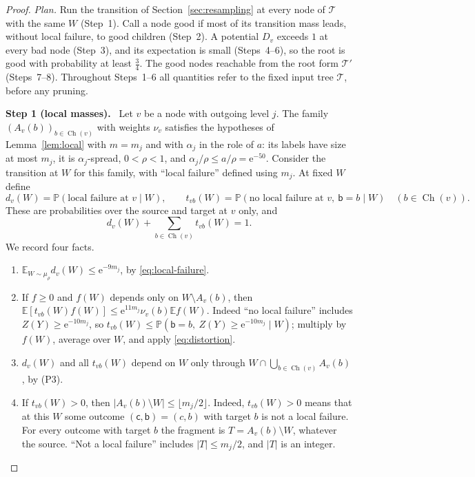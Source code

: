 \documentclass[11pt]{article}
\numberwithin{equation}{section}
\newcommand{\PP}{\mathbb P}
\newcommand{\EE}{\mathbb E}
\newcommand{\TT}{\mathcal T}
\newcommand{\ch}{\operatorname{Ch}}
\newcommand{\ee}{\mathrm e}
\newcommand{\src}{\mathsf c}
\newcommand{\tgt}{\mathsf b}
\newcommand{\step}[2]{\par\medskip\noindent\textbf{Step #1 (#2).}\ }
\begin{document}
\begin{proof}
\emph{Plan.} Run the transition of Section~\ref{sec:resampling} at every
node of $\TT$ with the same $W$ (Step~1). Call a node good if most of
its transition mass leads, without local failure, to good children
(Step~2). A potential $D_v$ exceeds $1$ at every bad node (Step~3), and
its expectation is small (Steps~4--6), so the root is good with
probability at least $\frac34$. The good nodes reachable from the root
form $\TT'$ (Steps~7--8). Throughout Steps~1--6 all quantities refer to
the fixed input tree $\TT$, before any pruning.

\step{1}{local masses}
Let $v$ be a node with outgoing level $j$. The family
$(A_v(b))_{b\in\ch(v)}$ with weights $\nu_v$ satisfies the hypotheses of
Lemma~\ref{lem:local} with $m=m_j$ and with $\alpha_j$ in the role of
$a$: its labels have size at most $m_j$, it is $\alpha_j$-spread,
$0<\rho<1$, and $\alpha_j/\rho\le a/\rho=\ee^{-50}$. Consider the
transition at $W$ for this family, with ``local failure'' defined using
$m_j$. At fixed $W$ define
\[
 d_v(W)=\PP(\text{local failure at }v\mid W),\qquad
 t_{vb}(W)=\PP(\text{no local failure at }v,\ \tgt=b\mid W)
 \quad(b\in\ch(v)).
\]
These are probabilities over the source and target at $v$ only, and
\begin{equation}\label{eq:local-masses}
 d_v(W)+\sum_{b\in\ch(v)}t_{vb}(W)=1.
\end{equation}
We record four facts.
\begin{enumerate}[label=(M\arabic*),leftmargin=2.8em,itemsep=2pt]
 \item $\EE_{W\sim\mu_\rho}d_v(W)\le\ee^{-9m_j}$, by
 \eqref{eq:local-failure}.
 \item If $f\ge0$ and $f(W)$ depends only on $W\setminus A_v(b)$, then
 $\EE[t_{vb}(W)f(W)]\le\ee^{11m_j}\nu_v(b)\EE f(W)$. Indeed ``no local
 failure'' includes $Z(Y)\ge\ee^{-10m_j}$, so
 $t_{vb}(W)\le\PP(\tgt=b,\ Z(Y)\ge\ee^{-10m_j}\mid W)$; multiply by
 $f(W)$, average over $W$, and apply \eqref{eq:distortion}.
 \item $d_v(W)$ and all $t_{vb}(W)$ depend on $W$ only through
 $W\cap\bigcup_{b\in\ch(v)}A_v(b)$, by (P3).
 \item If $t_{vb}(W)>0$, then
 $|A_v(b)\setminus W|\le\lfloor m_j/2\rfloor$. Indeed, $t_{vb}(W)>0$
 means that at this $W$ some outcome $(\src,\tgt)=(c,b)$ with target
 $b$ is not a local failure. For every outcome with target $b$ the
 fragment is $T=A_v(b)\setminus W$, whatever the source. ``Not a local
 failure'' includes $|T|\le m_j/2$, and $|T|$ is an integer.
\end{enumerate}


\end{proof}
\end{document}
